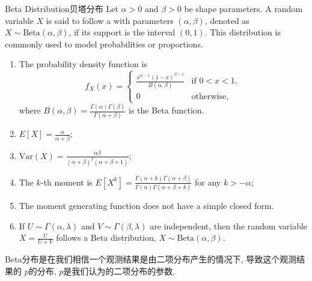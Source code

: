 \documentclass[../main.tex]{subfiles}
\begin{document}
\begin{proposition}{Beta Distribution}{贝塔分布}
Let $\alpha > 0$ and $\beta > 0$ be shape parameters. A random variable $X$ is said to follow a  with parameters $(\alpha, \beta)$, denoted as $X \sim \text{Beta}(\alpha, \beta)$, if its support is the interval $(0,1)$. This distribution is commonly used to model probabilities or proportions.
\begin{enumerate}
\item The probability density function is
$$f_X(x) = 
\begin{cases} 
\frac{x^{\alpha-1}(1-x)^{\beta-1}}{B(\alpha, \beta)} & \text{if } 0 < x < 1, \\
0 & \text{otherwise},
\end{cases}$$
where $B(\alpha, \beta) = \frac{\Gamma(\alpha)\Gamma(\beta)}{\Gamma(\alpha+\beta)}$ is the Beta function.
\item $E[X] = \frac{\alpha}{\alpha+\beta}$;
\item $\text{Var}(X) = \frac{\alpha\beta}{(\alpha+\beta)^2(\alpha+\beta+1)}$;
\item The $k$-th moment is $E[X^k] = \frac{\Gamma(\alpha+k)\Gamma(\alpha+\beta)}{\Gamma(\alpha)\Gamma(\alpha+\beta+k)}$ for any $k > -\alpha$;
\item The moment generating function does not have a simple closed form.
\item If $U \sim \Gamma(\alpha, \lambda)$ and $V \sim \Gamma(\beta, \lambda)$ are independent, then the random variable $X = \frac{U}{U+V}$ follows a Beta distribution, $X \sim \text{Beta}(\alpha, \beta)$.
\end{enumerate}
\end{proposition}

\begin{note}
    Beta分布是在我们相信一个观测结果是由二项分布产生的情况下, 导致这个观测结果的 \(  p  \)的分布, \(  p  \)是我们认为的二项分布的参数.  
\end{note}
\end{document}
